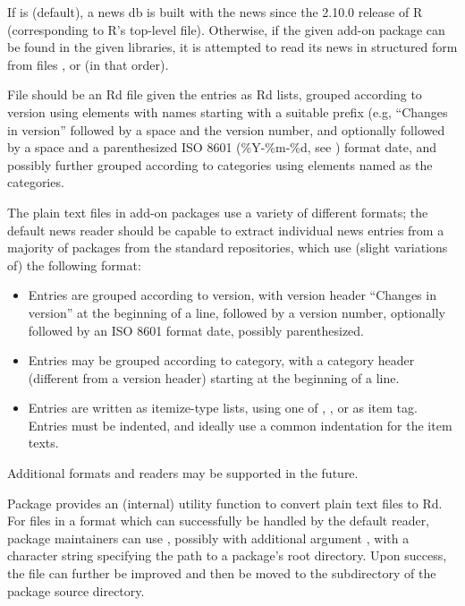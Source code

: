 \begin{Details}\relax
If  is  (default), a news db is built with the
news since the 2.10.0 release of R (corresponding to R's top-level
 file).  Otherwise, if the given add-on package can be
found in the given libraries, it is attempted to read its news in
structured form from files ,  or
 (in that order).

File  should be an Rd file given the entries as Rd
 lists, grouped according to version using
 elements with names starting with a suitable prefix
(e.g, ``Changes in version'' followed by a space and the version
number, and optionally followed by a space and a parenthesized ISO
8601 (\%Y-\%m-\%d, see ) format date, and
possibly further grouped according to categories using
 elements named as the categories.

The plain text  files in add-on packages use a variety of
different formats; the default news reader should be capable to
extract individual news entries from a majority of packages from the
standard repositories, which use (slight variations of) the following
format:

\begin{itemize}

\item Entries are grouped according to version, with version header
``Changes in version'' at the beginning of a line, followed by
a version number, optionally followed by an ISO 8601 format date,
possibly parenthesized.
\item Entries may be grouped according to category, with a category
header (different from a version header) starting at the beginning
of a line.
\item Entries are written as itemize-type lists, using one of
, \samp{*}, \samp{-} or \samp{+} as item tag.  Entries must
be indented, and ideally use a common indentation for the item
texts.

\end{itemize}


Additional formats and readers may be supported in the future.

Package  provides an (internal) utility function
 to convert plain text  files to Rd.  For
 files in a format which can successfully be handled by the
default reader, package maintainers can use , possibly with additional argument ,
with  a character string specifying the path to a package's
root directory.  Upon success, the  file can further be
improved and then be moved to the  subdirectory of the
package source directory.


\end{Details}
